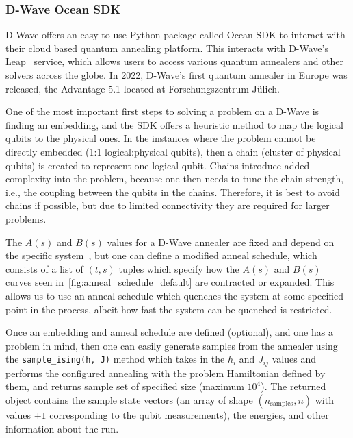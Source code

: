 \subsubsection{D-Wave Ocean SDK}
D-Wave offers an easy to use Python package called Ocean SDK to interact with their cloud based quantum annealing platform.
This interacts with D-Wave's Leap~\cite{dwave_leap} service, which allows users to access various quantum annealers and other solvers across the globe.
In 2022, D-Wave's first quantum annealer in Europe was released, the Advantage 5.1 located at Forschungszentrum Jülich.

One of the most important first steps to solving a problem on a D-Wave is finding an embedding, and the SDK offers a heuristic method to map the logical qubits to the physical ones.
In the instances where the problem cannot be directly embedded (1:1 logical:physical qubits), then a chain (cluster of physical qubits) is created to represent one logical qubit.
Chains introduce added complexity into the problem, because one then needs to tune the chain strength, i.e., the coupling between the qubits in the chains.
Therefore, it is best to avoid chains if possible, but due to limited connectivity they are required for larger problems.

The \( A(s) \) and \( B(s) \) values for a D-Wave annealer are fixed and depend on the specific system~\cite{dwave_anneal_schedules}, but one can define a modified anneal schedule, which consists of a list of \( (t, s) \) tuples which specify how the \( A(s) \) and \( B(s) \) curves seen in~\cref{fig:anneal_schedule_default} are contracted or expanded.
This allows us to use an anneal schedule which quenches the system at some specified point in the process, albeit how fast the system can be quenched is restricted.

Once an embedding and anneal schedule are defined (optional), and one has a problem in mind, then one can easily generate samples from the annealer using the \texttt{sample\_ising(h, J)} method which takes in the \( h_i \) and \( J_{ij} \) values and performs the configured annealing with the problem Hamiltonian defined by them, and returns sample set of specified size (maximum \( 10^4 \)).
The returned object contains the sample state vectors (an array of shape \( (n_\text{samples}, n) \) with values \( \pm 1 \) corresponding to the qubit measurements), the energies, and other information about the run.

